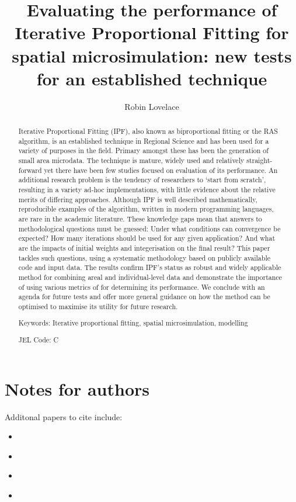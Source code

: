 \documentclass[a4paper,10pt]{article}
\title{Evaluating the performance of Iterative Proportional Fitting for spatial microsimulation: new tests for an established technique}
\author{Robin Lovelace}
\begin{document}
\maketitle

\begin{abstract}
Iterative Proportional Fitting (IPF), also known as biproportional fitting or the RAS algorithm,
is an established technique in Regional Science and
 has been used for a variety of purposes in the field. Primary amongst these has been
the generation of small area microdata.  
The technique is mature, widely used and relatively straight-forward
yet there have been few studies focused on evaluation of its performance.
An additional research problem is the tendency of 
researchers to `start from scratch', resulting in a variety ad-hoc implementations,
with little evidence about the relative merits of differing approaches.
Although IPF is well described mathematically, reproducible
examples of the algorithm, written in modern programming languages, are rare in the academic literature.
These knowledge gaps mean that answers to methodological questions must be guessed:
Under what conditions can convergence be expected?
How many iterations should be used for any given application? 
And what are the impacts of initial weights and integerisation on the final result?
This paper tackles such questions, using a systematic methodology 
based on publicly available code and input data. 
The results confirm IPF's status as robust and widely applicable 
method for combining areal and individual-level data and demonstrate the importance
of using various metrics of for determining its performance.
We conclude with an agenda for future tests and offer more general guidance on how
the method can be optimised to maximise its utility for future research.

Keywords: Iterative proportional fitting, spatial microsimulation, modelling

JEL Code: C
\end{abstract}

\section{Notes for authors}
Additonal papers to cite include:
\begin{itemize}
 \item \citet{harland2012}
\item \citet{Smith2009}
\item \citet{Cullinan2010}
\item 
\end{itemize}
\end{document}
